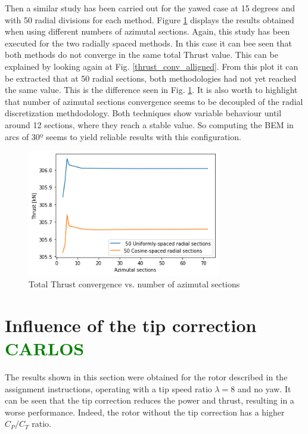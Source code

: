 Then a similar study has been carried out for the yawed case at 15 degrees and with 50 radial divisions for each method. Figure \ref{Thrust_conv_az_plt} displays the results obtained when using different numbers of azimutal sections. Again, this study has been executed for the two radially spaced methods. In this case it can bee seen that both methods do not converge in the same total Thrust value. This can be explained by looking again at Fig. \ref{thrust_conv_alligned}. From this plot it can be extracted that at 50 radial sections, both methodologies had not yet reached the same value. This is the difference seen in Fig. \ref{Thrust_conv_az_plt}. It is also worth to highlight that number of azimutal sections convergence seems to be decoupled of the radial discretization methdodology. Both techniques show variable behaviour until around 12 sections, where they reach a stable value. So computing the BEM in arcs of 30º seems to yield reliable results with this configuration.  


\begin{figure}[htbp]
\includegraphics[width=0.75\textwidth]{./img/Thrust_conv_az_plt.png}
\caption{Total Thrust convergence vs. number of azimutal sections}
\centering
\label{Thrust_conv_az_plt}
\end{figure}



\section{Influence of the tip correction \textcolor{green}{CARLOS}}

The results shown in this section were obtained for the rotor described in the assignment instructions, operating with a tip speed ratio $ \lambda = 8 $ and no yaw. It can be seen that the tip correction reduces the power and thrust, resulting in a worse performance. Indeed, the rotor without the tip correction has a higher $ C_P/C_T $ ratio.

